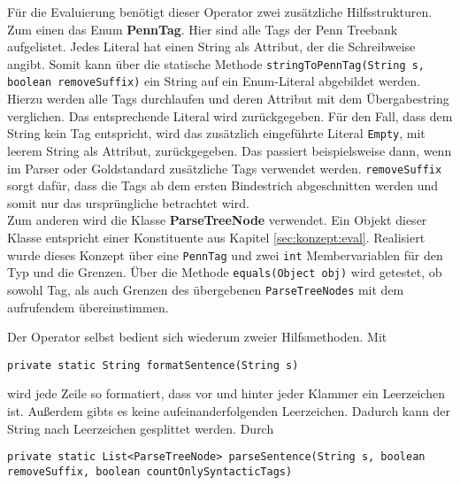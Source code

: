 Für die Evaluierung benötigt dieser Operator zwei zusätzliche Hilfsstrukturen. Zum einen das Enum \textbf{PennTag}. Hier sind alle Tags der Penn Treebank aufgelistet. Jedes Literal hat einen String als Attribut, der die Schreibweise angibt. Somit kann über die statische Methode \texttt{stringToPennTag(String s, boolean removeSuffix)} ein String auf ein Enum-Literal abgebildet werden. Hierzu werden alle Tags durchlaufen und deren Attribut mit dem Übergabestring verglichen. Das entsprechende Literal wird zurückgegeben. Für den Fall, dass dem String kein Tag entspricht, wird das zusätzlich eingeführte Literal \texttt{Empty}, mit leerem String als Attribut, zurückgegeben. Das passiert beispielsweise dann, wenn im Parser oder Goldstandard zusätzliche Tags verwendet werden. \texttt{removeSuffix} sorgt dafür, dass die Tags ab dem ersten Bindestrich abgeschnitten werden und somit nur das ursprüngliche betrachtet wird. \\
Zum anderen wird die Klasse \textbf{ParseTreeNode} verwendet. Ein Objekt dieser Klasse entspricht einer Konstituente aus Kapitel \ref{sec:konzept:eval}. Realisiert wurde dieses Konzept über eine \texttt{PennTag} und zwei \texttt{int} Membervariablen für den Typ und die Grenzen. Über die Methode \texttt{equals(Object obj)} wird getestet, ob sowohl Tag, als auch Grenzen des übergebenen \texttt{ParseTreeNodes} mit dem aufrufendem übereinstimmen. 

Der Operator selbst bedient sich wiederum zweier Hilfsmethoden. Mit 

\texttt{private static String formatSentence(String s)} 

wird jede Zeile so formatiert, dass vor und hinter jeder Klammer ein Leerzeichen ist. Außerdem gibts es keine aufeinanderfolgenden Leerzeichen. Dadurch kann der String nach Leerzeichen gesplittet werden. Durch

\texttt{private static List<ParseTreeNode> parseSentence(String s, boolean removeSuffix, boolean countOnlySyntacticTags)}

